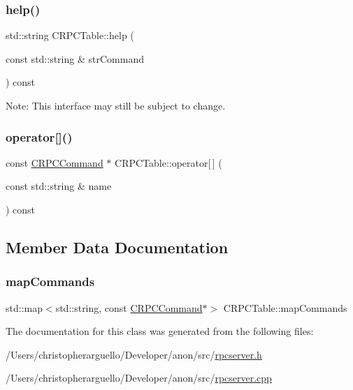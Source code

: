 \subsubsection{\texorpdfstring{help()}{help()}}
{\footnotesize\ttfamily std\+::string C\+R\+P\+C\+Table\+::help (\begin{DoxyParamCaption}\item[{const std\+::string \&}]{str\+Command }\end{DoxyParamCaption}) const}

Note\+: This interface may still be subject to change. \mbox{\label{class_c_r_p_c_table_aa06a59b1f7fe34668eab9a6a4a2491fa}} 
\subsubsection{\texorpdfstring{operator[]()}{operator[]()}}
{\footnotesize\ttfamily const \mbox{\hyperlink{class_c_r_p_c_command}{C\+R\+P\+C\+Command}} $\ast$ C\+R\+P\+C\+Table\+::operator\mbox{[}$\,$\mbox{]} (\begin{DoxyParamCaption}\item[{const std\+::string \&}]{name }\end{DoxyParamCaption}) const}



\subsection{Member Data Documentation}
\mbox{\label{class_c_r_p_c_table_abe193d7f72d98048f2a99ec13028f65f}} 
\subsubsection{\texorpdfstring{map\+Commands}{mapCommands}}
{\footnotesize\ttfamily std\+::map$<$std\+::string, const \mbox{\hyperlink{class_c_r_p_c_command}{C\+R\+P\+C\+Command}}$\ast$$>$ C\+R\+P\+C\+Table\+::map\+Commands\hspace{0.3cm}{\ttfamily [private]}}



The documentation for this class was generated from the following files\+:\begin{DoxyCompactItemize}
\item 
/\+Users/christopherarguello/\+Developer/anon/src/\mbox{\hyperlink{rpcserver_8h}{rpcserver.\+h}}\item 
/\+Users/christopherarguello/\+Developer/anon/src/\mbox{\hyperlink{rpcserver_8cpp}{rpcserver.\+cpp}}\end{DoxyCompactItemize}
